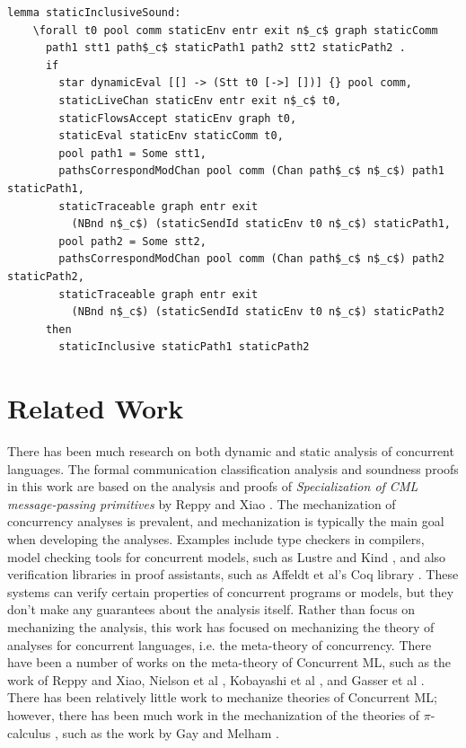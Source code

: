 \documentclass[letterpaper, 11pt]{extarticle}
\begin{document}
\begin{lstlisting}[language=logic, mathescape]
  lemma staticInclusiveSound:
    \forall t0 pool comm staticEnv entr exit n$_c$ graph staticComm
      path1 stt1 path$_c$ staticPath1 path2 stt2 staticPath2 .
      if
        star dynamicEval [[] -> (Stt t0 [->] [])] {} pool comm, 
        staticLiveChan staticEnv entr exit n$_c$ t0, 
        staticFlowsAccept staticEnv graph t0, 
        staticEval staticEnv staticComm t0, 
        pool path1 = Some stt1, 
        pathsCorrespondModChan pool comm (Chan path$_c$ n$_c$) path1 staticPath1, 
        staticTraceable graph entr exit
          (NBnd n$_c$) (staticSendId staticEnv t0 n$_c$) staticPath1, 
        pool path2 = Some stt2, 
        pathsCorrespondModChan pool comm (Chan path$_c$ n$_c$) path2 staticPath2, 
        staticTraceable graph entr exit
          (NBnd n$_c$) (staticSendId staticEnv t0 n$_c$) staticPath2
      then
        staticInclusive staticPath1 staticPath2
\end{lstlisting}

  



\section{Related Work}
There has been much research on both dynamic and static analysis of concurrent languages.  
The formal communication classification analysis and soundness proofs in this work are
based on the analysis and proofs of \textit{Specialization of CML message-passing primitives}
by Reppy and Xiao \cite{reppy2007specialization}.
The mechanization of concurrency analyses is prevalent, and mechanization is typically the main
goal when developing the analyses. Examples include type checkers in compilers,
model checking tools for concurrent models, such as Lustre \cite{halbwachs1991synchronous} and Kind \cite{kind},
and also verification libraries in proof assistants, such as Affeldt et al's Coq library \cite{affeldt2008coq}.
These systems can verify certain properties of concurrent programs or models, but they don't
make any guarantees about the analysis itself.
Rather than focus on mechanizing the analysis, this work has focused on
mechanizing the theory of analyses for concurrent languages, i.e. the meta-theory of concurrency.
There have been a number of works on the meta-theory of Concurrent ML,
such as the work of Reppy and Xiao, Nielson et al \cite{nielson1994higher}, Kobayashi et al \cite{kobayashi1995static}, and Gasser et al \cite{gasser1997systematic}.
There has been relatively little work to mechanize theories of Concurrent ML; however,
there has been much work in the mechanization of the theories of $\pi$-calculus
\cite{milner1999communicating}, such as the work by Gay \cite{gay2001framework} and Melham \cite{melham1994mechanized}. 
\end{document}
